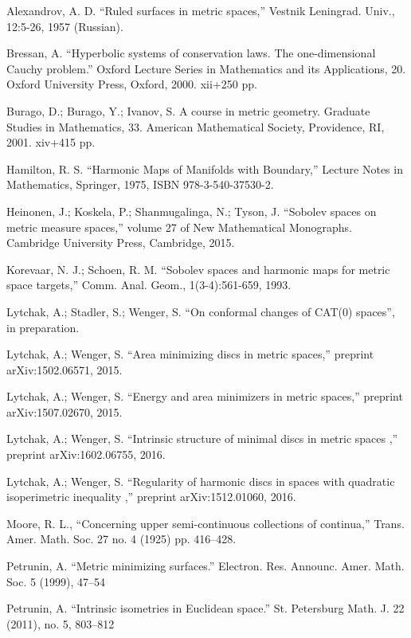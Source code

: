 \documentclass{article}
\begin{document}
\begin{thebibliography}{52}

 Alexandrov, A. D. ``Ruled  surfaces  in  metric  spaces,'' Vestnik Leningrad. Univ., 12:5-26, 1957 (Russian).

 Bressan, A.
``Hyperbolic systems of conservation laws.
The one-dimensional Cauchy problem.'' 
Oxford Lecture Series in Mathematics and its Applications, 20. 
Oxford University Press, Oxford, 2000. 
xii+250 pp.

Burago, D.; Burago, Y.; Ivanov, S.
A course in metric geometry.
Graduate Studies in Mathematics, 33. American Mathematical Society, Providence, RI, 2001. xiv+415 pp.

 Hamilton, R. S. ``Harmonic Maps of Manifolds with Boundary,'' Lecture Notes in Mathematics, Springer, 1975, ISBN 978-3-540-37530-2.

 Heinonen, J.;  Koskela, P.;  Shanmugalinga, N.; Tyson, J. ``Sobolev spaces on metric measure spaces,''
volume 27 of New Mathematical Monographs. Cambridge University Press, Cambridge, 2015.

Korevaar, N. J.; Schoen, R. M. ``Sobolev spaces and harmonic maps for metric space targets,'' Comm. Anal. Geom., 1(3-4):561-659, 1993.

 Lytchak, A.; Stadler, S.; Wenger, S.  ``On conformal changes of CAT(0) spaces'', in preparation.

Lytchak, A.; Wenger, S. ``Area minimizing discs in metric spaces,'' preprint arXiv:1502.06571, 2015.

Lytchak, A.; Wenger, S. ``Energy and area minimizers in metric spaces,'' preprint  arXiv:1507.02670, 2015.

Lytchak, A.; Wenger, S. ``Intrinsic structure of minimal discs in metric spaces ,'' preprint  arXiv:1602.06755, 2016.

Lytchak, A.; Wenger, S. ``Regularity of harmonic discs in spaces with quadratic isoperimetric inequality  ,'' preprint  arXiv:1512.01060, 2016.

Moore, R. L.,
``Concerning upper semi-continuous collections of continua,''
Trans. Amer. Math. Soc. 27 no. 4 (1925) pp. 416--428.

 Petrunin, A.
``Metric minimizing surfaces.''
Electron. Res. Announc. Amer. Math. Soc. 5 (1999), 47--54 

 Petrunin, A.
``Intrinsic isometries in Euclidean space.''
St. Petersburg Math. J. 22 (2011), no. 5, 803--812 


\end{thebibliography}
\end{document}
